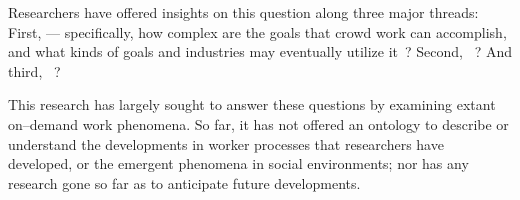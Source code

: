 \documentclass[trackingWork]{subfiles}
\begin{document}
Researchers have offered insights on this question along three major threads:
First,  ---
specifically, how complex are the goals that crowd work can accomplish, and
what kinds of goals and industries may eventually utilize it~\cite{foundry,suzukiAtelier,KimStoria,yuanAlmost,YuEncouragingOutside,Nebeling:2016:WCW:2858036.2858169,Hahn:2016:KAB:2858036.2858364,crowdForgeKittur}?
Second, ~\cite{embracingErrorKrishna,bernsteinSoylent,sensitiveTasks,LykourentzouPersonalityMatters,KucherbaevReLauncher,Law:2016:CKC:2858036.2858144,Cai:2016:CRI:2858036.2858237,Chang:2016:ACC:2858036.2858411,Newell:2016:OMA:2858036.2858490}?
And third, ~\cite{turkopticon,storiesIraniSilberman,dynamo,crowdcollab,whyWouldAnyoneBrewer,takingAHITMcInnis}?

This research has largely sought to answer these questions by examining extant on--demand work phenomena.
So far, it has not offered an ontology to describe or understand
the developments in worker processes that researchers have developed, or
the emergent phenomena in social environments;
nor has any research
gone so far as to anticipate future developments.
\end{document}
